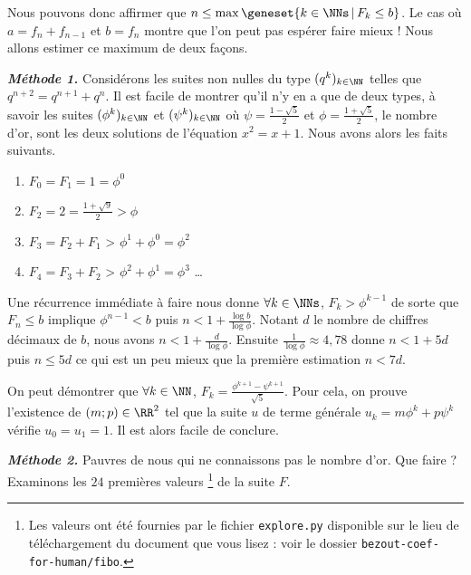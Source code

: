 \medskip


Nous pouvons donc affirmer que $n \leq \max \geneset{k \in \NNs \,|\, F_k \leq b}$. Le cas où $a = f_n + f_{n-1}$ et $b = f_n$ montre que l'on peut pas espérer faire mieux ! Nous allons estimer ce maximum de deux façons.




\bigskip


\emph{\bfseries Méthode 1.}
Considérons les suites non nulles du type $(q^k)_{k \in \NN}$ telles que $q^{n+2} = q^{n+1} + q^n$.
Il est facile de montrer qu'il n'y en a que de deux types, à savoir les suites $(\phi^k)_{k \in \NN}$ et $(\psi^k)_{k \in \NN}$ où $\psi = \frac{1 - \sqrt{5}}{2}$ et $\phi = \frac{1 + \sqrt{5}}{2}$, le nombre d'or, sont les deux solutions de l'équation $x^2 = x +1$. Nous avons alors les faits suivants.

\begin{enumerate}
	\item $F_0 = F_1 = 1 = \phi^0$

	\item $F_2 = 2 = \frac{1 + \sqrt{9}}{2} > \phi$

	\item $F_3 = F_2 + F_1$ > $\phi^1 + \phi^0 = \phi^2$

	\item $F_4 = F_3 + F_2$ > $\phi^2 + \phi^1 = \phi^3$ \dots
\end{enumerate}


Une récurrence immédiate à faire nous donne $\forall k \in \NNs$, $F_k > \phi^{k-1}$ de sorte que $F_n \leq b$ implique $\phi^{n-1} < b$ puis $n < 1 + \frac{\log b}{\log \phi}$.
Notant $d$ le nombre de chiffres décimaux de $b$, nous avons $n < 1 + \frac{d}{\log \phi}$. 
Ensuite $\frac{1}{\log \phi} \approx 4,78$ donne $n < 1 + 5d$ puis $n \leq 5d$ ce qui est un peu mieux que la première estimation $n < 7d$.


\begin{remark}
	On peut démontrer que $\forall k \in \NN$, $F_k = \frac{\phi^{k+1} - \psi^{k+1}}{\sqrt{5}}$.
	Pour cela, on prouve l'existence de $(m ;p) \in \RR^2$ tel que la suite $u$ de terme générale $u_k = m \phi^k  + p \psi^k$ vérifie $u_0 = u_1 = 1$. Il est alors facile de conclure.
\end{remark}




\bigskip


\emph{\bfseries Méthode 2.}
Pauvres de nous qui ne connaissons pas le nombre d'or.
Que faire ? Examinons les $24$ premières valeurs
\footnote{
	Les valeurs ont été fournies par le fichier \texttt{explore.py} disponible  sur le lieu de téléchargement du document que vous lisez : voir le dossier \texttt{bezout-coef-for-human/fibo}.
}
de la suite $F$.

